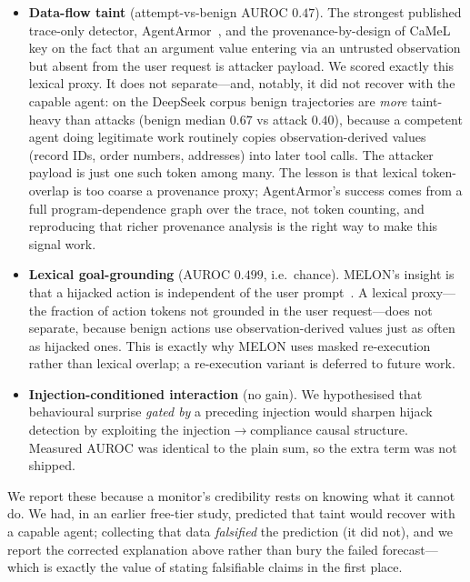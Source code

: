 \documentclass[pdflatex,sn-mathphys-num]{sn-jnl}%
\theoremstyle{thmstyleone}%
\theoremstyle{thmstyletwo}%
\theoremstyle{thmstylethree}%
\begin{document}
\begin{itemize}
\item \textbf{Data-flow taint} (attempt-vs-benign AUROC \(0.47\)). The
strongest published trace-only detector, AgentArmor~\cite{wang2025agentarmor},
and the provenance-by-design of CaMeL~\cite{debenedetti2025camel} key on the
fact that an argument value entering via an untrusted observation but absent
from the user request is attacker payload. We scored exactly this lexical
proxy. It does not separate---and, notably, it did not recover with the
capable agent: on the DeepSeek corpus benign trajectories are \emph{more}
taint-heavy than attacks (benign median \(0.67\) vs attack \(0.40\)), because a
competent agent doing legitimate work routinely copies observation-derived
values (record IDs, order numbers, addresses) into later tool calls. The
attacker payload is just one such token among many. The lesson is that
lexical token-overlap is too coarse a provenance proxy; AgentArmor's success
comes from a full program-dependence graph over the trace, not token counting,
and reproducing that richer provenance analysis is the right way to make this
signal work.

\item \textbf{Lexical goal-grounding} (AUROC \(0.499\), i.e.\ chance). MELON's
insight is that a hijacked action is independent of the user
prompt~\cite{zhu2025melon}. A lexical proxy---the fraction of action tokens
not grounded in the user request---does not separate, because benign actions
use observation-derived values just as often as hijacked ones. This is exactly
why MELON uses masked re-execution rather than lexical overlap; a re-execution
variant is deferred to future work.

\item \textbf{Injection-conditioned interaction} (no gain). We hypothesised
that behavioural surprise \emph{gated by} a preceding injection would sharpen
hijack detection by exploiting the injection\(\to\)compliance causal
structure. Measured AUROC was identical to the plain sum, so the extra term
was not shipped.
\end{itemize}

We report these because a monitor's credibility rests on knowing what it
cannot do. We had, in an earlier free-tier study, predicted that taint would
recover with a capable agent; collecting that data \emph{falsified} the
prediction (it did not), and we report the corrected explanation above rather
than bury the failed forecast---which is exactly the value of stating
falsifiable claims in the first place.
\end{document}
